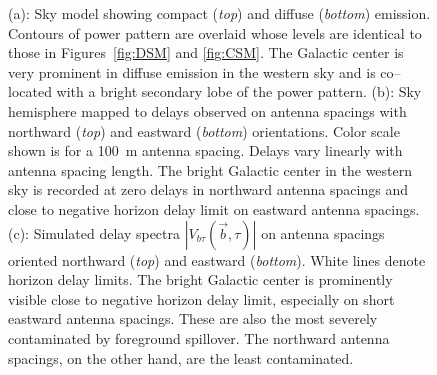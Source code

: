 \documentclass[preprint2,iop,numberedappendix]{emulateapj}
\begin{document}
\begin{figure}[htb]
\centering
{}
\caption{(a): Sky model showing compact ({\it top}) and diffuse ({\it bottom}) emission. Contours of power pattern are overlaid whose levels are identical to those in Figures~\ref{fig:DSM} and \ref{fig:CSM}. The Galactic center is very prominent in diffuse emission in the western sky and is co--located with a bright secondary lobe of the power pattern. (b): Sky hemisphere mapped to delays observed on antenna spacings with northward ({\it top}) and eastward ({\it bottom}) orientations. Color scale shown is for a 100~m antenna spacing. Delays vary linearly with antenna spacing length. The bright Galactic center in the western sky is recorded at zero delays in northward antenna spacings and close to negative horizon delay limit on eastward antenna spacings. (c): Simulated delay spectra $|V_{b\tau}(\vec{b},\tau)|$ on antenna spacings oriented northward ({\it top}) and eastward ({\it bottom}). White lines denote horizon delay limits. The bright Galactic center is prominently visible close to negative horizon delay limit, especially on short eastward antenna spacings. These are also the most severely contaminated by foreground spillover. The northward antenna spacings, on the other hand, are the least contaminated.}
\label{fig:breakup}
\end{figure}
\end{document}
